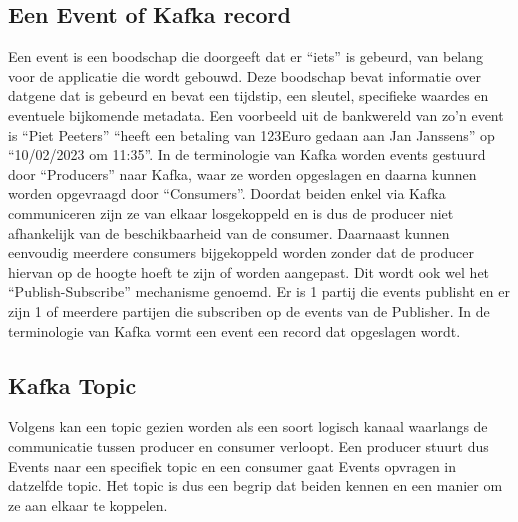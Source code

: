 \subsection{Een Event of Kafka record}
Een event is een boodschap die doorgeeft dat er ``iets'' is gebeurd, van belang voor de applicatie die wordt gebouwd. Deze boodschap bevat informatie over datgene dat is gebeurd en bevat een tijdstip, een sleutel, specifieke waardes en eventuele bijkomende metadata. Een voorbeeld uit de bankwereld van zo'n event is ``Piet Peeters'' ``heeft een betaling van 123Euro gedaan aan Jan Janssens'' op ``10/02/2023 om 11:35''.
\newline
In de terminologie van Kafka worden events gestuurd door ``Producers'' naar Kafka, waar ze worden opgeslagen en daarna kunnen worden opgevraagd door ``Consumers''. Doordat beiden enkel via Kafka communiceren zijn ze van elkaar losgekoppeld en is dus de producer niet afhankelijk van de beschikbaarheid van de consumer.\autocite{Kafka2023}
\newline
Daarnaast kunnen eenvoudig meerdere consumers bijgekoppeld worden zonder dat de producer hiervan op de hoogte hoeft te zijn of worden aangepast.
\newline
Dit wordt ook wel het ``Publish-Subscribe'' mechanisme genoemd. Er is 1 partij die events publisht en er zijn 1 of meerdere partijen die subscriben op de events van de Publisher.
In de terminologie van Kafka vormt een event een record dat opgeslagen wordt.


\subsection{Kafka Topic}
Volgens \textcite{Harbour2023} kan een topic gezien worden als een soort logisch kanaal waarlangs de communicatie tussen producer en consumer verloopt. Een producer stuurt dus Events naar een specifiek topic en een consumer gaat Events opvragen in datzelfde topic. Het topic is dus een begrip dat beiden kennen en een manier om ze aan elkaar te koppelen.


